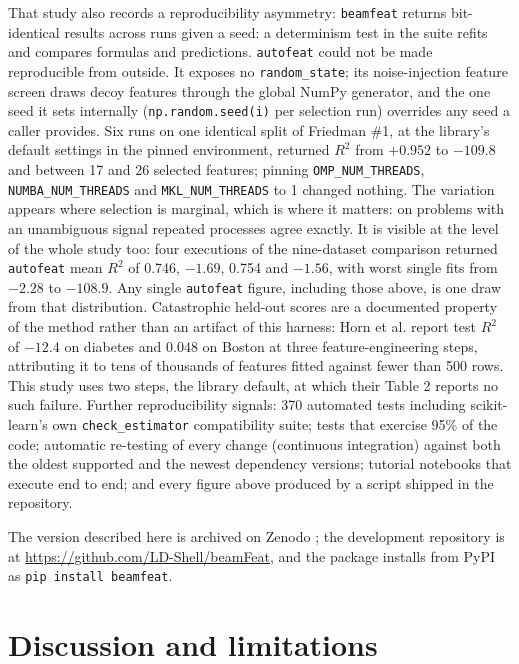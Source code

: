 \documentclass[
]{article}
\begin{document}
That study also records a reproducibility asymmetry: \texttt{beamfeat}
returns bit-identical results across runs given a seed: a determinism
test in the suite refits and compares formulas and predictions.
\texttt{autofeat} could not be made reproducible from outside. It exposes
no \texttt{random\_state}; its noise-injection feature screen draws
decoy features through the global NumPy generator, and the one seed it
sets internally (\texttt{np.random.seed(i)} per selection run) overrides
any seed a caller provides. Six runs
on one identical split of Friedman \#1, at the library's default
settings in the pinned environment, returned \(R^2\) from \(+0.952\) to
\(-109.8\) and between 17 and 26 selected features; pinning
\texttt{OMP\_NUM\_THREADS}, \texttt{NUMBA\_NUM\_THREADS} and
\texttt{MKL\_NUM\_THREADS} to 1 changed nothing. The variation appears
where selection is marginal, which is where it matters: on problems with
an unambiguous signal repeated processes agree exactly. It is visible at
the level of the whole study too: four executions of the nine-dataset
comparison returned \texttt{autofeat} mean \(R^2\) of 0.746, \(-1.69\),
0.754 and \(-1.56\), with worst single fits from \(-2.28\) to
\(-108.9\). Any single \texttt{autofeat} figure, including those above,
is one draw from that distribution. Catastrophic held-out scores are a
documented property of the method rather than an artifact of this
harness: Horn et al. \citep{horn2019} report test \(R^2\) of \(-12.4\)
on diabetes and \(0.048\) on Boston at three feature-engineering steps,
attributing it to tens of thousands of features fitted against fewer
than 500 rows. This study uses two steps, the library default, at which
their Table 2 reports no such failure. Further reproducibility signals:
370 automated tests including scikit-learn's own
\texttt{check\_estimator} compatibility suite; tests that exercise 95\%
of the code; automatic re-testing of every change (continuous
integration) against both the oldest supported and the newest dependency
versions; tutorial notebooks that execute end to end; and every figure
above produced by a script shipped in the repository.

The version described here is archived on Zenodo \citep{beamfeat}; the
development repository is at \url{https://github.com/LD-Shell/beamFeat},
and the package installs from PyPI as \texttt{pip\ install\ beamfeat}.

\hypertarget{discussion}{%
\section{Discussion and limitations}\label{discussion}}
\end{document}
